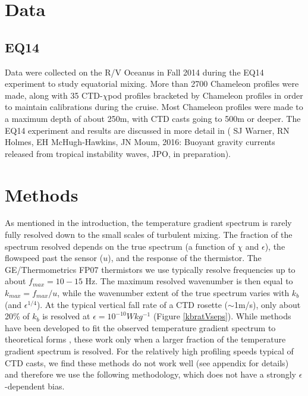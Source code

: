 \documentclass{ametsoc}
\begin{document}
\section{Data }


\subsection{EQ14}

Data were collected on the R/V Oceanus in Fall 2014 during the EQ14 experiment to study equatorial mixing.  More than 2700 Chameleon profiles were made, along with 35 CTD-$\chi$pod profiles bracketed by Chameleon profiles in order to maintain calibrations during the cruise. Most Chameleon profiles were made to a maximum depth of about 250m, with CTD casts going to 500m or deeper. The EQ14 experiment and results are discussed in more detail in ( SJ Warner, RN Holmes, EH McHugh-Hawkins, JN Moum, 2016: Buoyant gravity currents released from tropical instability waves, JPO, in preparation).



\section{Methods}


As mentioned in the introduction, the temperature gradient spectrum is rarely fully resolved down to the small scales of turbulent mixing. The fraction of the spectrum resolved depends on the true spectrum (a function of $\chi$ and $\epsilon$), the flowspeed past the sensor ($u$), and the response of the thermistor. The GE/Thermometrics FP07 thermistors we use typically resolve frequencies up to about $f_{max}=10-15$ Hz. The maximum resolved wavenumber is then equal to $k_{max}=f_{max}/u$, while the wavenumber extent of the true spectrum varies with $k_b$ (and $\epsilon^{1/4}$). At the typical vertical fall rate of a CTD rosette ($\sim$1m/s), only about 20\% of $k_b$ is resolved at $\epsilon=10^{-10}Wkg^{-1}$ (Figure \ref{kbratVseps}). While methods have been developed to fit the observed temperature gradient spectrum to theoretical forms \citep{ruddicketal00}, these work only when a larger fraction of the temperature gradient spectrum is resolved. For the relatively high profiling speeds typical of CTD casts, we find these methods do not work well (see appendix for details) and therefore we use the following methodology, which does not have a strongly $\epsilon$-dependent bias.
\end{document}
